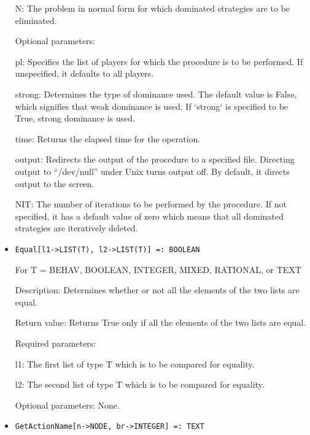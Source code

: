 \begin{itemize}
\bd
\item
[N:] The problem in normal form for which dominated strategies are to
be eliminated.
\ed

\item
[Optional parameters:]\hfil\null

\bd
\item
[pl:] Specifies the list of players for which the procedure is to be
performed.  If unspecified, it defaults to all players.
\item
[strong:] Determines the type of dominance used.  The default value is
False, which signifies that weak dominance is used.  If `strong` is
specified to be True, strong dominance is used.
\item
[time:] Returns the elapsed time for the operation.
\item
[output:] Redirects the output of the procedure to a specified file.
Directing output to ``/dev/null'' under Unix turns output off.  By
default, it directs output to the screen.
\item
[NIT:] The number of iterations to be performed by the procedure.  If
not specified, it has a default value of zero which means that all
dominated strategies are iteratively deleted.
\ed
\ed

\item
\protect \large \begin{verbatim}
Equal[l1->LIST(T), l2->LIST(T)] =: BOOLEAN
\end{verbatim}\normalsize

	For T = BEHAV, BOOLEAN, INTEGER, MIXED, RATIONAL, or TEXT

\bd
\item
[Description:] Determines whether or not all the elements of the two
lists are equal.
\item
[Return value:] Returns True only if all the elements of the two lists
are equal.
\item
[Required parameters:]\hfil\null
	
\bd
\item
[l1:] The first list of type T which is to be compared for equality.
\item
[l2:] The second list of type T which is to be compared for equality.
\ed

\item
[Optional parameters:] None.

\ed

\item
\protect \large \begin{verbatim}
GetActionName[n->NODE, br->INTEGER] =: TEXT
\end{verbatim}\normalsize


\end{itemize}
